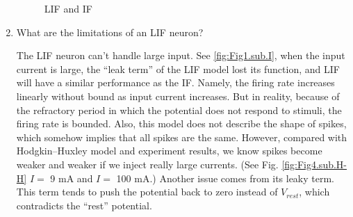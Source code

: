 \documentclass[11pt]{article}
\begin{document}
\begin{enumerate}
			\begin{figure}[htb]
			\centering
			\caption{LIF and IF}
			\end{figure}
			
		\item What are the limitations of an LIF neuron?
			
		The LIF neuron can't handle large input. See \ref{fig:Fig1.sub.I}, when the input current is large, the ``leak term'' of the LIF model lost its function, and LIF will have a similar performance as the IF. Namely, the firing rate increases linearly without bound as input current increases. But in reality, because of the refractory period in which the potential does not respond to stimuli, the firing rate is bounded. Also, this model does not describe the shape of spikes, which somehow implies that all spikes are the same. However, compared with Hodgkin–Huxley model and experiment results, we know spikes become weaker and weaker if we inject really large currents. (See Fig. \ref{fig:Fig4.sub.H-H} $I =$ 9 mA and $I =$ 100 mA.) Another issue comes from its leaky term. This term tends to push the potential back to zero instead of $V_{rest}$, which contradicts the ``rest'' potential.
			
	\end{enumerate}
	
\end{document}
